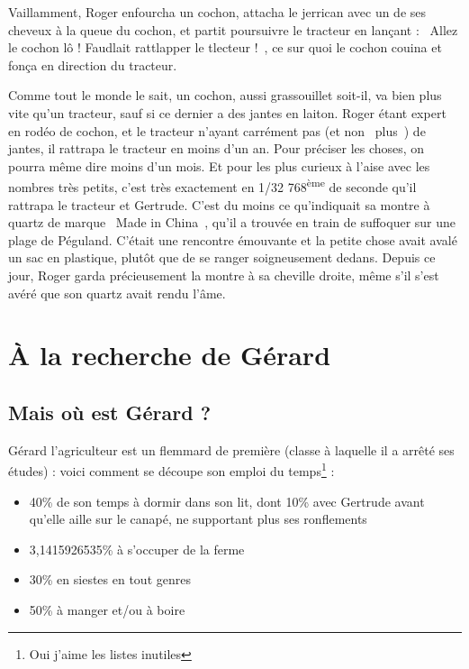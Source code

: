 \documentclass[a5paper, 10pt, twoside]{book}
\newcommand{\cg}{\guillemotleft~}
\newcommand{\cd}{~\guillemotright}
\begin{document}
Vaillamment, Roger enfourcha un cochon, attacha le jerrican avec un de ses cheveux à la queue du cochon, et partit poursuivre le tracteur en lançant : \cg Allez le cochon lô ! Faudlait rattlapper le tlecteur !\cd, ce sur quoi le cochon couina et fonça en direction du tracteur.

Comme tout le monde le sait, un cochon, aussi grassouillet soit-il, va bien plus vite qu'un tracteur, sauf si ce dernier a des jantes en laiton. Roger étant expert en rodéo de cochon, et le tracteur n'ayant carrément pas (et non \cg plus\cd) de jantes, il rattrapa le tracteur en moins d'un an. Pour préciser les choses, on pourra même dire moins d'un mois. Et pour les plus curieux à l'aise avec les nombres très petits, c'est très exactement en 1/32 768\textsuperscript{ème} de seconde qu'il rattrapa le tracteur et Gertrude. C'est du moins ce qu'indiquait sa montre à quartz de marque \cg Made in China\cd, qu'il a trouvée en train de suffoquer sur une plage de Péguland. C'était une rencontre émouvante et la petite chose avait avalé un sac en plastique, plutôt que de se ranger soigneusement dedans. Depuis ce jour, Roger garda précieusement la montre à sa cheville droite, même s'il s'est avéré que son quartz avait rendu l'âme.

\chapter{À la recherche de Gérard}
\section{Mais où est Gérard ?}
Gérard l'agriculteur est un flemmard de première (classe à laquelle il a arrêté ses études) : voici comment se découpe son emploi du temps\footnote{Oui j'aime les listes inutiles} :
\begin{itemize}
	\item 40\% de son temps à dormir dans son lit, dont 10\% avec Gertrude avant qu'elle aille sur le canapé, ne supportant plus ses ronflements
	\item 3,1415926535\% à s'occuper de la ferme
	\item 30\% en siestes en tout genres
	\item 50\% à manger et/ou à boire
\end{itemize}
\end{document}
